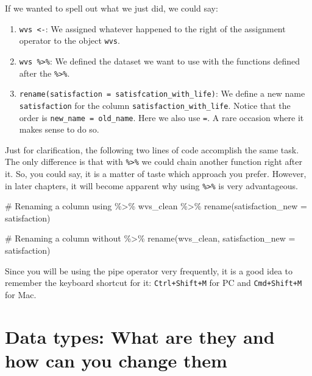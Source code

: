 \documentclass[
  letterpaper,
]{krantz}
\makeatletter
\newenvironment{Shaded}{\begin{snugshade}}{\end{snugshade}}
\newcommand{\AttributeTok}[1]{\textcolor[rgb]{0.40,0.45,0.13}{#1}}
\newcommand{\CommentTok}[1]{\textcolor[rgb]{0.37,0.37,0.37}{#1}}
\newcommand{\FunctionTok}[1]{\textcolor[rgb]{0.28,0.35,0.67}{#1}}
\newcommand{\NormalTok}[1]{\textcolor[rgb]{0.00,0.23,0.31}{#1}}
\newcommand{\SpecialCharTok}[1]{\textcolor[rgb]{0.37,0.37,0.37}{#1}}
\newenvironment{kframe}{%
\medskip{}
\setlength{\fboxsep}{.8em}
 \def\at@end@of@kframe{}%
 \ifinner\ifhmode%
  \def\at@end@of@kframe{\end{minipage}}%
  \begin{minipage}{\columnwidth}%
 \fi\fi%
 \def\FrameCommand##1{\hskip\@totalleftmargin \hskip-\fboxsep
 \colorbox{shadecolor}{##1}\hskip-\fboxsep
     \hskip-\linewidth \hskip-\@totalleftmargin \hskip\columnwidth}%
 \MakeFramed {\advance\hsize-\width
   \@totalleftmargin\z@ \linewidth\hsize
   \@setminipage}}%
 {\par\unskip\endMakeFramed%
 \at@end@of@kframe}
\renewenvironment{Shaded}{\begin{kframe}}{\end{kframe}}
\makeatother
\begin{document}
If we wanted to spell out what we just did, we could say:

\begin{enumerate}
\def\labelenumi{\arabic{enumi}.}
\item
  \texttt{wvs\ \textless{}-}: We assigned whatever happened to the right
  of the assignment operator to the object \texttt{wvs}.
\item
  \texttt{wvs\ \%\textgreater{}\%}: We defined the dataset we want to
  use with the functions defined after the \texttt{\%\textgreater{}\%}.
\item
  \texttt{rename(satisfaction\ =\ satisfcation\_with\_life)}: We define
  a new name \texttt{satisfaction} for the column
  \texttt{satisfaction\_with\_life}. Notice that the order is
  \texttt{new\_name\ =\ old\_name}. Here we also use \texttt{=}. A rare
  occasion where it makes sense to do so.
\end{enumerate}

Just for clarification, the following two lines of code accomplish the
same task. The only difference is that with \texttt{\%\textgreater{}\%}
we could chain another function right after it. So, you could say, it is
a matter of taste which approach you prefer. However, in later chapters,
it will become apparent why using \texttt{\%\textgreater{}\%} is very
advantageous.

\begin{Shaded}
\begin{Highlighting}[]
\CommentTok{\# Renaming a column using \textquotesingle{}\%\textgreater{}\%\textquotesingle{}}
\NormalTok{wvs\_clean }\SpecialCharTok{\%\textgreater{}\%} \FunctionTok{rename}\NormalTok{(}\AttributeTok{satisfaction\_new =}\NormalTok{ satisfaction)}

\CommentTok{\# Renaming a column without \textquotesingle{}\%\textgreater{}\%\textquotesingle{}}
\FunctionTok{rename}\NormalTok{(wvs\_clean, }\AttributeTok{satisfaction\_new =}\NormalTok{ satisfaction)}
\end{Highlighting}
\end{Shaded}

Since you will be using the pipe operator very frequently, it is a good
idea to remember the keyboard shortcut for it: \texttt{Ctrl+Shift+M} for
PC and \texttt{Cmd+Shift+M} for Mac.

\section{Data types: What are they and how can you change
them}\label{change-data-types}
\end{document}
